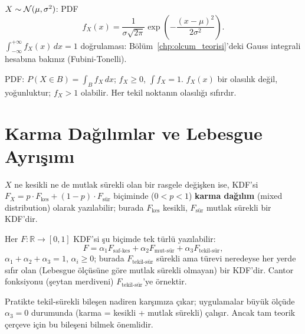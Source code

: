\begin{ornek}
$X \sim \mathcal{N}(\mu, \sigma^2)$: PDF
\[
  f_X(x) = \frac{1}{\sigma\sqrt{2\pi}} \exp\!\left(-\frac{(x-\mu)^2}{2\sigma^2}\right).
\]
$\int_{-\infty}^{+\infty} f_X(x) \, dx = 1$ doğrulaması: Bölüm~\ref{chp:olcum_teorisi}'deki
Gauss integrali hesabına bakınız (Fubini-Tonelli).
\end{ornek}

\begin{mikroozet}
PDF: $P(X \in B) = \int_B f_X \, dx$; $f_X \geq 0$, $\int f_X = 1$.
$f_X(x)$ bir olasılık değil, yoğunluktur; $f_X > 1$ olabilir.
Her tekil noktanın olasılığı sıfırdır.
\end{mikroozet}

\section{Karma Dağılımlar ve Lebesgue Ayrışımı}
\label{sec:karma}

\begin{tanim}
\label{def:karma}
$X$ ne kesikli ne de mutlak sürekli olan bir rasgele değişken ise,
KDF'si $F_X = p \cdot F_{\text{kes}} + (1-p) \cdot F_{\text{sür}}$
biçiminde ($0 < p < 1$) \textbf{karma dağılım} (mixed distribution) olarak
yazılabilir; burada $F_{\text{kes}}$ kesikli, $F_{\text{sür}}$ mutlak sürekli
bir KDF'dir.
\end{tanim}

\begin{onerme}
\label{prop:lebesgue_ayrisim}
Her $F : \mathbb{R} \to [0,1]$ KDF'si şu biçimde tek türlü yazılabilir:
\[
  F = \alpha_1 F_{\text{saf-kes}} + \alpha_2 F_{\text{mut-sür}} + \alpha_3 F_{\text{tekil-sür}},
\]
$\alpha_1 + \alpha_2 + \alpha_3 = 1$, $\alpha_i \geq 0$; burada
$F_{\text{tekil-sür}}$ sürekli ama türevi neredeyse her yerde sıfır olan
(Lebesgue ölçüsüne göre mutlak sürekli olmayan) bir KDF'dir.
Cantor fonksiyonu (şeytan merdiveni) $F_{\text{tekil-sür}}$'ye örnektir.
\end{onerme}

\begin{hocanotu}
Pratikte tekil-sürekli bileşen nadiren karşımıza çıkar; uygulamalar
büyük ölçüde $\alpha_3 = 0$ durumunda (karma = kesikli + mutlak sürekli) çalışır.
Ancak tam teorik çerçeve için bu bileşeni bilmek önemlidir.
\end{hocanotu}

